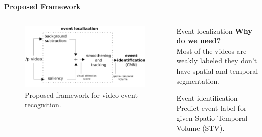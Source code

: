 \begin{frame}{\textbf{Proposed Framework}}
\begin{columns}
	\begin{column}{0.6\textwidth}
	\begin{figure}
	\begin{framed}
		\centering
		\includegraphics[width=\textwidth]{./img/outline.png}
	\end{framed}
		\caption{Proposed framework for video event recognition.}
	\end{figure}
	\end{column}
	\begin{column}{0.3\textwidth}
		\begin{varblock}[\textwidth]{Event localization}
			\textbf{Why do we need?} \\Most of the videos are weakly labeled they don't have spatial and temporal segmentation.
		\end{varblock}
		\begin{varblock}[\textwidth]{Event identification}
			Predict event label for given Spatio Temporal Volume (STV).
		\end{varblock}
	\end{column}
\end{columns}	
\end{frame}

